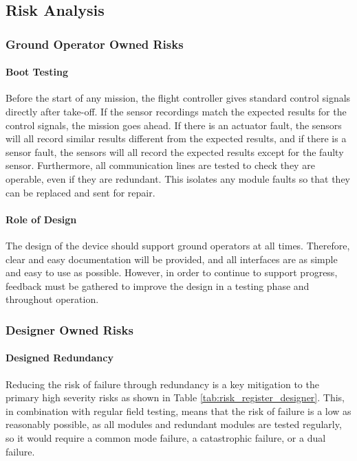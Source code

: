 \subsection{Risk Analysis}\label{sub_section:tgt_risk}
\subsubsection{Ground Operator Owned Risks}\label{sub_sub_section:tgt_ground_operator_risk} 

\paragraph{Boot Testing}
Before the start of any mission, the flight controller gives standard control signals directly after take-off. If the sensor recordings match the expected results for the control signals, the mission goes ahead. If there is an actuator fault, the sensors will all record similar results different from the expected results, and if there is a sensor fault, the sensors will all record the expected results except for the faulty sensor. Furthermore, all communication lines are tested to check they are operable, even if they are redundant. This isolates any module faults so that they can be replaced and sent for repair.
\paragraph{Role of Design}
The design of the device should support ground operators at all times. Therefore, clear and easy documentation will be provided, and all interfaces are as simple and easy to use as possible. However, in order to continue to support progress, feedback must be gathered to improve the design in a testing phase and throughout operation.

\subsubsection{Designer Owned Risks}\label{sub_sub_section:tgt_design_risk}
 
\paragraph{Designed Redundancy}
Reducing the risk of failure through redundancy is a key mitigation to the primary high severity risks as shown in Table \ref{tab:risk_register_designer}. This, in combination with regular field testing, means that the risk of failure is a low as reasonably possible, as all modules and redundant modules are tested regularly, so it would require a common mode failure, a catastrophic failure, or a dual failure.
